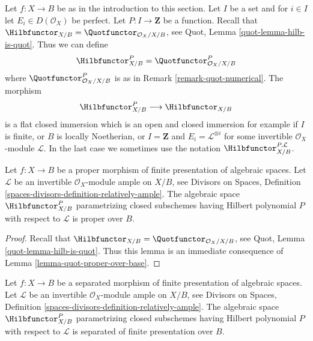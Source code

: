 \begin{remark}
\label{remark-hilb-numerical}
Let $f : X \to B$ be as in the introduction to this section.
Let $I$ be a set and for $i \in I$ let $E_i \in D(\mathcal{O}_X)$ be perfect.
Let $P : I \to \mathbf{Z}$ be a function. Recall that
$\Hilbfunctor_{X/B} = \Quotfunctor_{\mathcal{O}_X/X/B}$, see
Quot, Lemma \ref{quot-lemma-hilb-is-quot}.
Thus we can define
$$
\Hilbfunctor^P_{X/B} = \Quotfunctor^P_{\mathcal{O}_X/X/B}
$$
where $\Quotfunctor^P_{\mathcal{O}_X/X/B}$ is as in
Remark \ref{remark-quot-numerical}. The morphism
$$
\Hilbfunctor^P_{X/B} \longrightarrow \Hilbfunctor_{X/B}
$$
is a flat closed immersion which is an open and closed immersion
for example if $I$ is finite, or $B$ is locally Noetherian, or
$I = \mathbf{Z}$ and $E_i = \mathcal{L}^{\otimes i}$ for some
invertible $\mathcal{O}_X$-module $\mathcal{L}$. In the last case
we sometimes use the notation $\Hilbfunctor^{P, \mathcal{L}}_{X/B}$.
\end{remark}

\begin{lemma}
\label{lemma-hilb-proper-over-base}
Let $f : X \to B$ be a proper morphism of finite presentation
of algebraic spaces. Let $\mathcal{L}$ be an invertible
$\mathcal{O}_X$-module ample on $X/B$, see
Divisors on Spaces, Definition
\ref{spaces-divisors-definition-relatively-ample}.
The algebraic space $\Hilbfunctor^P_{X/B}$
parametrizing closed subschemes
having Hilbert polynomial $P$ with respect to $\mathcal{L}$
is proper over $B$.
\end{lemma}

\begin{proof}
Recall that $\Hilbfunctor_{X/B} = \Quotfunctor_{\mathcal{O}_X/X/B}$, see
Quot, Lemma \ref{quot-lemma-hilb-is-quot}.
Thus this lemma is an immediate consequence of
Lemma \ref{lemma-quot-proper-over-base}.
\end{proof}

\begin{lemma}
\label{lemma-hilb-qc-over-base}
Let $f : X \to B$ be a separated morphism of finite presentation
of algebraic spaces. Let $\mathcal{L}$ be an invertible
$\mathcal{O}_X$-module ample on $X/B$, see
Divisors on Spaces, Definition
\ref{spaces-divisors-definition-relatively-ample}.
The algebraic space $\Hilbfunctor^P_{X/B}$
parametrizing closed subschemes
having Hilbert polynomial $P$ with respect to $\mathcal{L}$
is separated of finite presentation over $B$.
\end{lemma}

